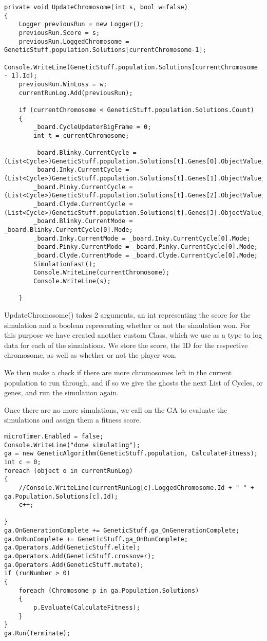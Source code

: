 \begin{lstlisting}[caption=Snippet of frmScreen.cs. UpdateChromosome method to change chromosome for each simulation, label=lst:updateChromosome]
private void UpdateChromosome(int s, bool w=false)
{
	Logger previousRun = new Logger();
	previousRun.Score = s;
	previousRun.LoggedChromosome = GeneticStuff.population.Solutions[currentChromosome-1];
	Console.WriteLine(GeneticStuff.population.Solutions[currentChromosome - 1].Id);
	previousRun.WinLoss = w;
	currentRunLog.Add(previousRun);

	if (currentChromosome < GeneticStuff.population.Solutions.Count)
	{
		_board.CycleUpdaterBigFrame = 0;
		int t = currentChromosome;

		_board.Blinky.CurrentCycle = (List<Cycle>)GeneticStuff.population.Solutions[t].Genes[0].ObjectValue;
		_board.Inky.CurrentCycle = (List<Cycle>)GeneticStuff.population.Solutions[t].Genes[1].ObjectValue;
		_board.Pinky.CurrentCycle = (List<Cycle>)GeneticStuff.population.Solutions[t].Genes[2].ObjectValue;
		_board.Clyde.CurrentCycle = (List<Cycle>)GeneticStuff.population.Solutions[t].Genes[3].ObjectValue;
		_board.Blinky.CurrentMode = _board.Blinky.CurrentCycle[0].Mode;
		_board.Inky.CurrentMode = _board.Inky.CurrentCycle[0].Mode;
		_board.Pinky.CurrentMode = _board.Pinky.CurrentCycle[0].Mode;
		_board.Clyde.CurrentMode = _board.Clyde.CurrentCycle[0].Mode;
		SimulationFast();
		Console.WriteLine(currentChromosome);
		Console.WriteLine(s);

	}
\end{lstlisting}

UpdateChromosome() takes 2 arguments, an int representing the score for the simulation and a boolean representing whether or not the simulation won. For this purpose we have created another custom Class, which we use as a type to log data for each of the simulations. We store the score, the ID for the respective chromosome, as well as whether or not the player won.

We then make a check if there are more chromosomes left in the current population to run through, and if so we give the ghosts the next List of Cycles, or genes, and run the simulation again.

Once there are no more simulations, we call on the GA to evaluate the simulations and assign them a fitness score.


\begin{lstlisting}[caption=Snippet of frmScreen.cs continued. Starting the GA and evaluation, label=lst:gaEvo]
microTimer.Enabled = false;
Console.WriteLine("done simulating");
ga = new GeneticAlgorithm(GeneticStuff.population, CalculateFitness);
int c = 0;
foreach (object o in currentRunLog)
{
	//Console.WriteLine(currentRunLog[c].LoggedChromosome.Id + " " + ga.Population.Solutions[c].Id);
	c++;

}
ga.OnGenerationComplete += GeneticStuff.ga_OnGenerationComplete;
ga.OnRunComplete += GeneticStuff.ga_OnRunComplete;
ga.Operators.Add(GeneticStuff.elite);
ga.Operators.Add(GeneticStuff.crossover);
ga.Operators.Add(GeneticStuff.mutate);
if (runNumber > 0)
{
	foreach (Chromosome p in ga.Population.Solutions)
	{
		p.Evaluate(CalculateFitness);
	}
}
ga.Run(Terminate);
\end{lstlisting}

